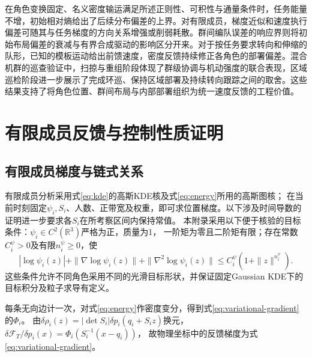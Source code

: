 \documentclass[UTF8,a4paper,11pt,fontset=none]{ctexart}
\newcommand{\R}{\mathbb R}\newcommand{\KL}{\operatorname{KL}}
\begin{document}
在角色变换固定、名义密度输运满足所述正则性、可积性与通量条件时，任务能量不增，初始相对熵给出了后续分布偏差的上界。对有限成员，梯度近似和速度执行偏差可随其与任务梯度的方向关系增强或削弱耗散。群间编队误差的响应界则将初始布局偏差的衰减与有界合成驱动的影响区分开来。对于按任务要求转向和伸缩的队形，已知的模板运动给出前馈速度，密度反馈持续修正各角色的部署偏差。混合机群的巡查验证中，扫掠与重组阶段体现了群级协调与机动强度的联合表现，区域巡检阶段进一步展示了完成环巡、保持区域部署及持续转向跟踪之间的取舍。这些结果支持了将角色位置、群间布局与内部部署组织为统一速度反馈的工程价值。

\appendix
\section{有限成员反馈与控制性质证明}\label{app:interfaces}

\subsection{有限成员梯度与链式关系}\label{app:graph-query}\label{app:template-conditions}
有限成员分析采用式\eqref{eq:kde}的高斯KDE核及式\eqref{eq:energy}所用的高斯图核；
在当前时刻固定$\psi_i,S_i$、人数、正带宽及权重，即可求位置梯度。以下涉及时间导数的证明进一步要求各$S_i$在所考察区间内保持常值。
本附录采用以下便于核验的目标条件：$\psi_i\in C^2(\R^3)$严格为正，质量为1，
一阶矩为零且二阶矩有限；存在常数$C_i^\psi>0$及有限$n_i^\psi\ge0$，使
\[
|\log\psi_i(z)|+\|\nabla\log\psi_i(z)\|+\|\nabla^2\log\psi_i(z)\|
\le C_i^\psi(1+\|z\|^{n_i^\psi}).
\]
这些条件允许不同角色采用不同的光滑目标形状，并保证固定Gaussian KDE下的目标积分及粒子求导有定义。

每条无向边计一次，对式\eqref{eq:energy}作密度变分，得到式\eqref{eq:variational-gradient}的$\Phi_i$。
由$\delta\rho_i(z)=|\det S_i|\delta p_i(q_i+S_i z)$换元，
$\delta\mathcal F_T/\delta p_i(x)=\Phi_i(S_i^{-1}(x-q_i))$，
故物理坐标中的反馈梯度为式\eqref{eq:variational-gradient}。
\end{document}
